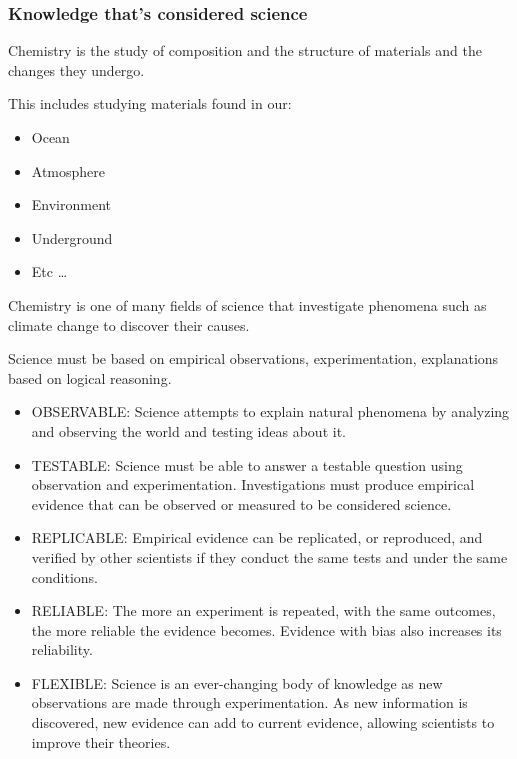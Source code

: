 
\subsubsection*{Knowledge that's considered science}

\begin{definition}[Chemistry]
	Chemistry is the study of composition and the structure of materials and the changes they undergo.

	This includes studying materials found in our:

	\begin{itemize}
		\item Ocean
		\item Atmosphere
		\item Environment
		\item Underground
		\item Etc \ldots
	\end{itemize}

	Chemistry is one of many fields of science that investigate phenomena such as climate change to discover their causes.
\end{definition}

\begin{definition}[Science]
	Science must be based on empirical observations, experimentation, explanations based on logical reasoning.
	\begin{itemize}
		\item OBSERVABLE: Science attempts to explain natural phenomena by analyzing and observing the world and testing ideas about it.
		\item TESTABLE: Science must be able to answer a testable question using observation and experimentation. Investigations must produce empirical evidence that can be observed or measured to be considered science.
		\item REPLICABLE: Empirical evidence can be replicated, or reproduced, and verified by other scientists if they conduct the same tests and under the same conditions.
		\item RELIABLE: The more an experiment is repeated, with the same outcomes, the more reliable the evidence becomes. Evidence with bias also increases its reliability.
		\item FLEXIBLE: Science is an ever-changing body of knowledge as new observations are made through experimentation. As new information is discovered, new evidence can add to current evidence, allowing scientists to improve their theories.
	\end{itemize}
\end{definition}

